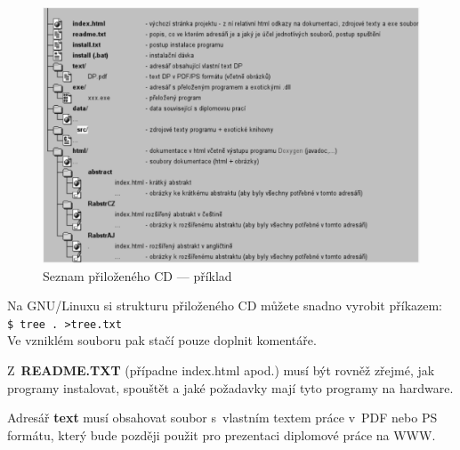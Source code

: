 \documentclass[11pt,twoside,a4paper]{book}
\begin{document}
\begin{figure}[h]
\begin{center}
\includegraphics[width=14cm]{figures/seznamcd}
\caption{Seznam přiloženého CD --- příklad}
\label{fig:seznamcd}
\end{center}
\end{figure}

Na GNU/Linuxu si strukturu přiloženého CD můžete snadno vyrobit příkazem:\\ 
\verb|$ tree . >tree.txt|\\
Ve vzniklém souboru pak stačí pouze doplnit komentáře.

Z~\textbf{README.TXT} (případne index.html apod.)  musí být rovněž zřejmé, jak programy instalovat, spouštět a jaké požadavky mají tyto programy na hardware.

Adresář \textbf{text}  musí obsahovat soubor s~vlastním textem práce v~PDF nebo PS formátu, který bude později použit pro prezentaci diplomové práce na WWW.
\end{document}
